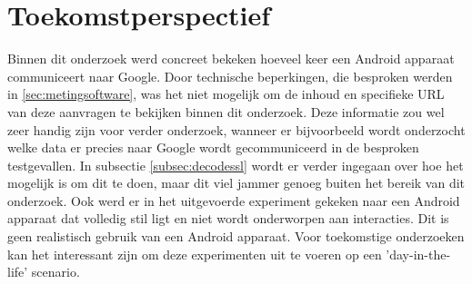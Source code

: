 \section{Toekomstperspectief}
Binnen dit onderzoek werd concreet bekeken hoeveel keer een Android apparaat communiceert naar Google. Door technische beperkingen, die besproken werden in \ref{sec:metingsoftware}, was het niet mogelijk om de inhoud en specifieke URL van deze aanvragen te bekijken binnen dit onderzoek. Deze informatie zou wel zeer handig zijn voor verder onderzoek, wanneer er bijvoorbeeld wordt onderzocht welke data er precies naar Google wordt gecommuniceerd in de besproken testgevallen. In subsectie \ref{subsec:decodessl} wordt er verder ingegaan over hoe het mogelijk is om dit te doen, maar dit viel jammer genoeg buiten het bereik van dit onderzoek. Ook werd er in het uitgevoerde experiment gekeken naar een Android apparaat dat volledig stil ligt en niet wordt onderworpen aan interacties. Dit is geen realistisch gebruik van een Android apparaat. Voor toekomstige onderzoeken kan het interessant zijn om deze experimenten uit te voeren op een 'day-in-the-life' scenario.